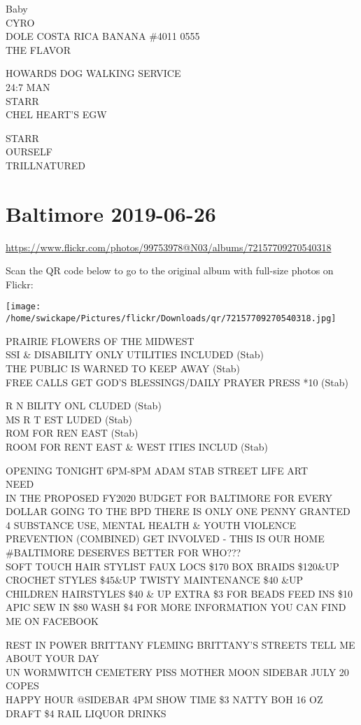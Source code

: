 \documentclass[10pt,letterpaper]{article}
\begin{document}
Baby\\
CYRO\\
DOLE COSTA RICA BANANA \#4011 0555\\
THE FLAVOR

HOWARDS DOG WALKING SERVICE\\
24:7 MAN\\
STARR\\
CHEL HEART'S EGW

STARR\\
OURSELF\\
TRILLNATURED


\section*{Baltimore 2019-06-26}

\url{https://www.flickr.com/photos/99753978@N03/albums/72157709270540318}

Scan the QR code below to go to the original album with full-size photos on Flickr:

\texttt{[image: /home/swickape/Pictures/flickr/Downloads/qr/72157709270540318.jpg]}


PRAIRIE FLOWERS OF THE MIDWEST\\
SSI \& DISABILITY ONLY UTILITIES INCLUDED (Stab)\\
THE PUBLIC IS WARNED TO KEEP AWAY (Stab)\\
FREE CALLS GET GOD'S BLESSINGS/DAILY PRAYER PRESS *10 (Stab)

R N BILITY ONL CLUDED (Stab)\\
MS R T EST LUDED (Stab)\\
ROM FOR REN EAST (Stab)\\
ROOM FOR RENT EAST \& WEST ITIES INCLUD (Stab)

OPENING TONIGHT 6PM{-}8PM ADAM STAB STREET LIFE ART\\
NEED\\
IN THE PROPOSED FY2020 BUDGET FOR BALTIMORE FOR EVERY DOLLAR GOING TO THE BPD THERE IS ONLY ONE PENNY GRANTED 4 SUBSTANCE USE, MENTAL HEALTH \& YOUTH VIOLENCE PREVENTION (COMBINED) GET INVOLVED {-} THIS IS OUR HOME \#BALTIMORE DESERVES BETTER FOR WHO???\\
SOFT TOUCH HAIR STYLIST FAUX LOCS \$170 BOX BRAIDS \$120\&UP CROCHET STYLES \$45\&UP TWISTY MAINTENANCE \$40 \&UP CHILDREN HAIRSTYLES \$40 \& UP EXTRA \$3 FOR BEADS FEED INS \$10 APIC SEW IN \$80 WASH \$4 FOR MORE INFORMATION YOU CAN FIND ME ON FACEBOOK

REST IN POWER BRITTANY FLEMING BRITTANY'S STREETS TELL ME ABOUT YOUR DAY\\
UN WORMWITCH CEMETERY PISS MOTHER MOON SIDEBAR JULY 20\\
COPES\\
HAPPY HOUR @SIDEBAR 4PM SHOW TIME \$3 NATTY BOH 16 OZ DRAFT \$4 RAIL LIQUOR DRINKS
\end{document}
